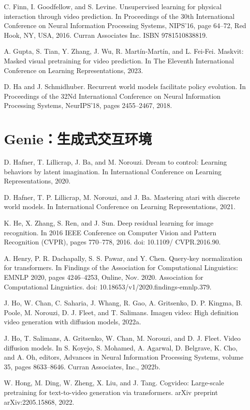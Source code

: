 \documentclass[10pt]{article}
\begin{document}
C. Finn, I. Goodfellow, and S. Levine. Unsupervised learning for physical interaction through video prediction. In Proceedings of the 30th International Conference on Neural Information Processing Systems, NIPS’16, page 64–72, Red Hook, NY, USA, 2016. Curran Associates Inc. ISBN 9781510838819.

A. Gupta, S. Tian, Y. Zhang, J. Wu, R. Martín-Martín, and L. Fei-Fei. Maskvit: Masked visual pretraining for video prediction. In The Eleventh International Conference on Learning Representations, 2023.

D. Ha and J. Schmidhuber. Recurrent world models facilitate policy evolution. In Proceedings of the 32Nd International Conference on Neural Information Processing Systems, NeurIPS’18, pages 2455–2467, 2018.

\section*{Genie：生成式交互环境}
D. Hafner, T. Lillicrap, J. Ba, and M. Norouzi. Dream to control: Learning behaviors by latent imagination. In International Conference on Learning Representations, 2020.

D. Hafner, T. P. Lillicrap, M. Norouzi, and J. Ba. Mastering atari with discrete world models. In International Conference on Learning Representations, 2021.

K. He, X. Zhang, S. Ren, and J. Sun. Deep residual learning for image recognition. In 2016 IEEE Conference on Computer Vision and Pattern Recognition (CVPR), pages 770–778, 2016. doi: 10.1109/ CVPR.2016.90.

A. Henry, P. R. Dachapally, S. S. Pawar, and Y. Chen. Query-key normalization for transformers. In Findings of the Association for Computational Linguistics: EMNLP 2020, pages 4246–4253, Online, Nov. 2020. Association for Computational Linguistics. doi: 10.18653/v1/2020.findings-emnlp.379.

J. Ho, W. Chan, C. Saharia, J. Whang, R. Gao, A. Gritsenko, D. P. Kingma, B. Poole, M. Norouzi, D. J. Fleet, and T. Salimans. Imagen video: High definition video generation with diffusion models, 2022a.

J. Ho, T. Salimans, A. Gritsenko, W. Chan, M. Norouzi, and D. J. Fleet. Video diffusion models. In S. Koyejo, S. Mohamed, A. Agarwal, D. Belgrave, K. Cho, and A. Oh, editors, Advances in Neural Information Processing Systems, volume 35, pages 8633–8646. Curran Associates, Inc., 2022b.

W. Hong, M. Ding, W. Zheng, X. Liu, and J. Tang. Cogvideo: Large-scale pretraining for text-to-video generation via transformers. arXiv preprint arXiv:2205.15868, 2022.
\end{document}
